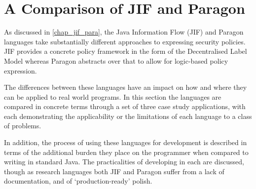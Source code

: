 \chapter{A Comparison of JIF and Paragon} \label{chap_comparison}

As discussed in \autoref{chap_jif_para}, the Java Information Flow (JIF) and Paragon languages take substantially different approaches to expressing security policies. JIF provides a concrete policy framework in the form of the Decentralised Label Model whereas Paragon abstracts over that to allow for logic-based policy expression.

The differences between these languages have an impact on how and where they can be applied to real world programs. In this section the languages are compared in concrete terms through a set of three case study applications, with each demonstrating the applicability or the limitations of each language to a class of problems.

In addition, the process of using these languages for development is described in terms of the additional burden they place on the programmer when compared to writing in standard Java. The practicalities of developing in each are discussed, though as research languages both JIF and Paragon suffer from a lack of documentation, and of `production-ready' polish.

\newpage



\newpage



\newpage




%

\newpage

